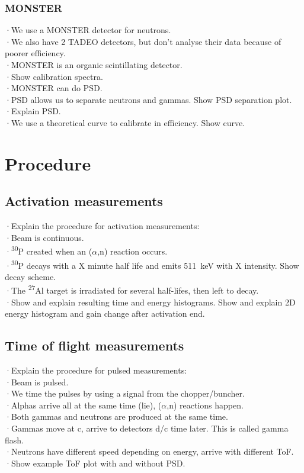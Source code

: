 \documentclass[a4paper,12pt]{report}
\newcommand{\an}{($\alpha$,n) }
\newcommand{\Aliso}{\textsuperscript{27}Al }
\newcommand{\Piso}{\textsuperscript{30}P }
\begin{document}
\subsubsection{MONSTER}
·We use a MONSTER detector for neutrons.\\
·We also have 2 TADEO detectors, but don't analyse their data because of poorer efficiency.\\
·MONSTER is an organic scintillating detector.\\
·Show calibration spectra.\\
·MONSTER can do PSD.\\
·PSD allows us to separate neutrons and gammas. Show PSD separation plot.\\
·Explain PSD.\\
·We use a theoretical curve to calibrate in efficiency. Show curve.\\

\section{Procedure}
\subsection{Activation measurements}
·Explain the procedure for activation measurements:\\
·Beam is continuous.\\
·\Piso created when an \an reaction occurs.\\
·\Piso decays with a X minute half life and emits \qty{511}{\keV} with X intensity. Show decay scheme.\\
·The \Aliso target is irradiated for several half-lifes, then left to decay.\\
·Show and explain resulting time and energy histograms. Show and explain 2D energy histogram and gain change after activation end.\\

\subsection{Time of flight measurements}
·Explain the procedure for pulsed measurements:\\
·Beam is pulsed.\\
·We time the pulses by using a signal from the chopper/buncher.\\	%
·Alphas arrive all at the same time (lie), \an reactions happen.\\
·Both gammas and neutrons are produced at the same time.\\	%
·Gammas move at c, arrive to detectors d/c time later. This is called gamma flash.\\
·Neutrons have different speed depending on energy, arrive with different ToF.\\
·Show example ToF plot with and without PSD.\\
\end{document}
